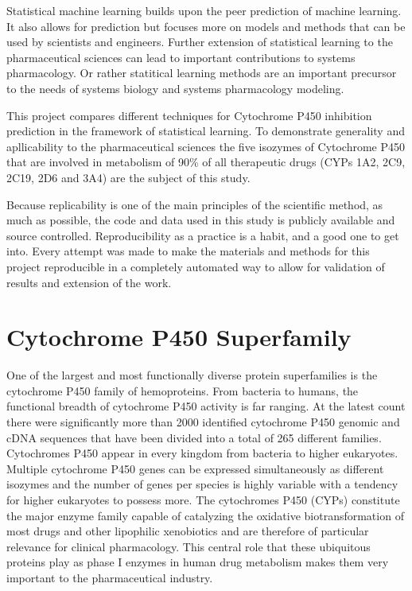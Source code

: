 Statistical machine learning builds upon the peer prediction of machine learning. It also allows for prediction but focuses more on models and methods that can be used by scientists and engineers. \cite{James2013} Further extension of statistical learning to the pharmaceutical sciences can lead to important contributions to systems pharmacology. Or rather statitical learning methods are an important precursor to the needs of systems biology and systems pharmacology modeling.

This project compares different techniques for Cytochrome P450 inhibition prediction in the framework of statistical learning. To demonstrate generality and apllicability to the pharmaceutical sciences the five isozymes of Cytochrome P450 that are involved in metabolism of 90\% of all therapeutic drugs (CYPs 1A2, 2C9, 2C19, 2D6 and 3A4) are the subject of this study.

Because replicability is one of the main principles of the scientific method, as much as possible, the code and data used in this study is publicly available and source controlled. Reproducibility as a practice is a habit, and a good one to get into. Every attempt was made to make the materials and methods for this project reproducible in a completely automated way to allow for validation of results and extension of the work.

\section{Cytochrome P450 Superfamily}

One of the largest and most functionally diverse protein superfamilies is the cytochrome P450 family of hemoproteins. From bacteria to humans, the functional breadth of cytochrome P450 activity is far ranging. At the latest count there were significantly more than 2000 identified cytochrome P450 genomic and cDNA sequences that have been divided into a total of 265 different families. \cite{Danielson2002} Cytochromes P450 appear in every kingdom from bacteria to higher eukaryotes. Multiple cytochrome P450 genes can be expressed simultaneously as different isozymes and the number of genes per species is highly variable with a tendency for higher eukaryotes to possess more. The cytochromes P450 (CYPs) constitute the major enzyme family capable of catalyzing the oxidative biotransformation of most drugs and other lipophilic xenobiotics and are therefore of particular relevance for clinical pharmacology. This central role that these ubiquitous proteins play as phase I enzymes in human drug metabolism makes them very important to the pharmaceutical industry.

